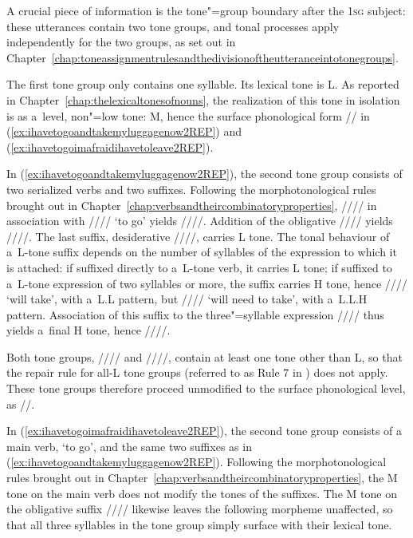 A crucial piece of information is the tone"=group {boundary} after the \textsc{1sg} subject: these utterances contain two tone groups, and tonal processes apply independently for the two groups, as set out in Chapter~\ref{chap:toneassignmentrulesandthedivisionoftheutteranceintotonegroups}.

The first {tone group} only contains one syllable. Its lexical tone is L. As reported in Chapter~\ref{chap:thelexicaltonesofnouns}, the realization of this tone in isolation is as a~level, non"=low tone: M, hence the surface phonological form // in (\ref{ex:ihavetogoandtakemyluggagenow2REP}) and (\ref{ex:ihavetogoimafraidihavetoleave2REP}). 

In (\ref{ex:ihavetogoandtakemyluggagenow2REP}), the second {tone group} consists of two serialized verbs and two
suffixes. 
Following the morphotonological rules brought out in
Chapter~\ref{chap:verbsandtheircombinatoryproperties}, //// in association
with //// `to go' yields ////. Addition of the {obligative} //// yields ////. The last {suffix}, {desiderative}
////, carries L tone. The tonal behaviour of a~L-tone {suffix}
depends on the number of syllables of the expression to which it is
attached: if suffixed directly to a~L-tone verb, it carries L tone; if
suffixed to a~L-tone expression of two syllables or more, the {suffix}
carries H tone, hence //// `will take', with a~L.L
pattern, but //// `will need to take', with a~L.L.H
pattern. Association of this {suffix} to the three"=syllable
expression //// thus yields a~final H tone, hence
////.

Both tone groups, //// and ////,
contain at least one tone other than L, so that the repair rule for
all-L tone groups (referred to as Rule 7 in ) does not apply. These tone
groups therefore proceed unmodified to the surface phonological level,
as //.

In (\ref{ex:ihavetogoimafraidihavetoleave2REP}), the second {tone group} consists of a main verb, `to go', and the same two suffixes as in (\ref{ex:ihavetogoandtakemyluggagenow2REP}). Following the morphotonological rules brought out in
Chapter~\ref{chap:verbsandtheircombinatoryproperties}, the M tone on the main verb does not modify the tones of the suffixes. The M tone on the {obligative} suffix //// likewise leaves the following morpheme unaffected, so that all three syllables in the tone group simply surface with their lexical tone.

